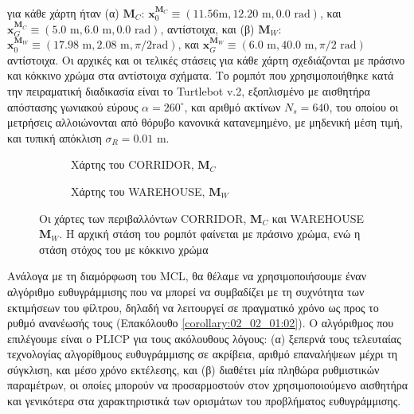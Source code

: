 για κάθε χάρτη ήταν (α) $\bm{M}_C$: $\bm{x}_0^{\bm{M}_C} \equiv (11.56\text{
  m}, 12.20\text{ m}, 0.0 \text{ rad})$, και $\bm{x}_G^{\bm{M}_C} \equiv (5.0
\text{ m}, 6.0 \text{ m}, 0.0 \text{ rad})$, αντίστοιχα, και (β) $\bm{M}_W$:
$\bm{x}_0^{\bm{M}_W} \equiv (17.98 \text{ m}, 2.08 \text{ m}, \pi/2 \text{
  rad})$, και $\bm{x}_G^{\bm{M}_W} \equiv (6.0 \text{ m}, 40.0 \text{ m}, \pi/2
\text{ rad})$ αντίστοιχα. Οι αρχικές και οι τελικές στάσεις για κάθε χάρτη
σχεδιάζονται με πράσινο και κόκκινο χρώμα στα αντίστοιχα σχήματα.  Το ρομπότ
που χρησιμοποιήθηκε κατά την πειραματική διαδικασία είναι το Turtlebot v.2,
εξοπλισμένο με αισθητήρα απόστασης γωνιακού εύρους $\alpha = 260^{\circ}$, και
αριθμό ακτίνων $N_s = 640$, του οποίου οι μετρήσεις αλλοιώνονται από θόρυβο
κανονικά κατανεμημένο, με μηδενική μέση τιμή, και τυπική απόκλιση $\sigma_R =
0.01$ m.

\begin{figure}\hspace{0.5cm}
  \begin{subfigure}{0.49\linewidth}\centering
    \vspace{1.0cm}
    
    \vspace{1.0cm}
    \caption{\small Χάρτης του CORRIDOR, $\bm{M}_C$}
    \label{fig:02_02_04:map_corridor}
  \end{subfigure}\hfill
  \begin{subfigure}{0.49\linewidth} \centering
    
    \vspace{0.25cm}
    \caption{\small Χάρτης του WAREHOUSE, $\bm{M}_W$}
    \label{fig:02_02_04:map_warehouse}
  \end{subfigure}
  \caption{\small Οι χάρτες των περιβαλλόντων CORRIDOR, $\bm{M}_C$ και
           WAREHOUSE $\bm{M}_W$. Η αρχική στάση του ρομπότ φαίνεται με πράσινο
           χρώμα, ενώ η στάση στόχος του με κόκκινο χρώμα}
\label{fig:02_02_04:maps}
\end{figure}

Ανάλογα με τη διαμόρφωση του MCL, θα θέλαμε να χρησιμοποιήσουμε έναν αλγόριθμο
ευθυγράμμισης που να μπορεί να συμβαδίζει με τη συχνότητα των εκτιμήσεων του
φίλτρου, δηλαδή να λειτουργεί σε πραγματικό χρόνο ως προς το ρυθμό ανανέωσής
τους (Επακόλουθο \ref{corollary:02_02_01:02}). Ο αλγόριθμος που επιλέγουμε
είναι ο PLICP \cite{Censi2008a} για τους ακόλουθους λόγους: (α) ξεπερνά τους
τελευταίας τεχνολογίας αλγορίθμους ευθυγράμμισης σε ακρίβεια, αριθμό
επαναλήψεων μέχρι τη σύγκλιση, και μέσο χρόνο εκτέλεσης, και (β) διαθέτει μία
πληθώρα ρυθμιστικών παραμέτρων, οι οποίες μπορούν να προσαρμοστούν στον
χρησιμοποιούμενο αισθητήρα και γενικότερα στα χαρακτηριστικά των ορισμάτων του
προβλήματος ευθυγράμμισης.

